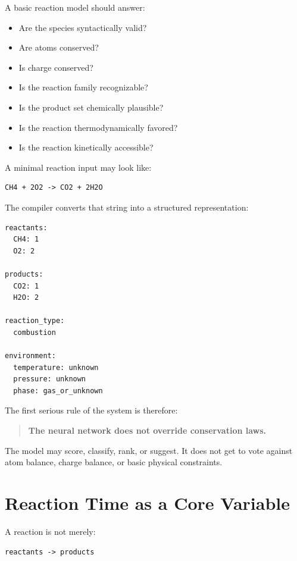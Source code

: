 \documentclass[11pt]{article}
\begin{document}
A basic reaction model should answer:

\begin{itemize}[leftmargin=1.2cm]
  \item Are the species syntactically valid?
  \item Are atoms conserved?
  \item Is charge conserved?
  \item Is the reaction family recognizable?
  \item Is the product set chemically plausible?
  \item Is the reaction thermodynamically favored?
  \item Is the reaction kinetically accessible?
\end{itemize}

A minimal reaction input may look like:

\begin{lstlisting}[caption={Raw reaction input}]
CH4 + 2O2 -> CO2 + 2H2O
\end{lstlisting}

The compiler converts that string into a structured representation:

\begin{lstlisting}[caption={Structured reaction representation}]
reactants:
  CH4: 1
  O2: 2

products:
  CO2: 1
  H2O: 2

reaction_type:
  combustion

environment:
  temperature: unknown
  pressure: unknown
  phase: gas_or_unknown
\end{lstlisting}

The first serious rule of the system is therefore:

\begin{quote}
\textbf{The neural network does not override conservation laws.}
\end{quote}

The model may score, classify, rank, or suggest. It does not get to vote against atom balance, charge balance, or basic physical constraints.

\section{Reaction Time as a Core Variable}

A reaction is not merely:

\begin{lstlisting}
reactants -> products
\end{lstlisting}
\end{document}
